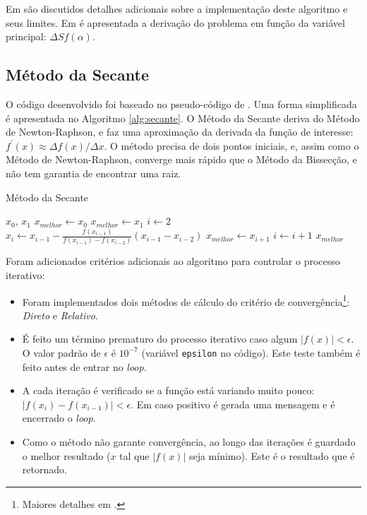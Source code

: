 \documentclass[final,5p]{elsarticle}
\numberwithin{equation}{section}
\begin{document}
Em \cite{relatoriobisseccao} são discutidos detalhes adicionais sobre a implementação deste algoritmo e seus limites. Em \cite{relatorionewtonraphson} é apresentada a derivação do problema em função da variável principal: $\Delta S f(\alpha)$.

    \subsection{Método da Secante}
    
    O código desenvolvido foi baseado no pseudo-código de \cite{burden2016analise}. Uma forma simplificada é apresentada no Algoritmo \ref{alg:secante}. O Método da Secante deriva do Método de Newton-Raphson, e faz uma aproximação da derivada da função de interesse: $f^{\prime}(x) \approx \Delta f(x) / \Delta x$. O método precisa de dois pontos iniciais, e, assim como o Método de Newton-Raphson, converge mais rápido que o Método da Bissecção, e não tem garantia de encontrar uma raiz. 

    \begin{algorithm}
        \caption{Método da Secante}\label{alg:secante}
        \begin{algorithmic}
            \Require $x_0$, $x_1$
                \State $x_{melhor} \gets x_0$
            \Else
                \State $x_{melhor} \gets x_1$
            \EndIf
            \State $i \gets 2$
            \Repeat
                \State $x_{i} \gets x_{i-1} - \frac{f(x_{i-1})}{f(x_{i-1})-f(x_{i-2})}(x_{i-1}-x_{i-2})$
                    \State $x_{melhor} \gets x_{i+1}$
                \EndIf
                \State $i \gets i+1$
            \State \Return $x_{melhor}$
        \end{algorithmic}
    \end{algorithm}

    Foram adicionados critérios adicionais ao algoritmo para controlar o processo iterativo:

    \begin{itemize}
        \item Foram implementados dois métodos de cálculo do critério de convergência\footnote{Maiores detalhes em \cite{relatoriobisseccao}.}: \emph{Direto} e \emph{Relativo}.
        \item É feito um término prematuro do processo iterativo caso algum $|f(x)| < \epsilon$. O valor padrão de $\epsilon$ é $10^{-7}$ (variável \verb|epsilon| no código). Este teste também é feito antes de entrar no \emph{loop}.
        \item A cada iteração é verificado se a função está variando muito pouco: $|f(x_i)-f(x_{i-1})| < \epsilon$. Em caso positivo é gerada uma mensagem e é encerrado o \emph{loop}.
        \item Como o método não garante convergência, ao longo das iterações é guardado o melhor resultado ($x$ tal que $|f(x)|$ seja mínimo). Este é o resultado que é retornado.
    \end{itemize}
    
\end{document}
